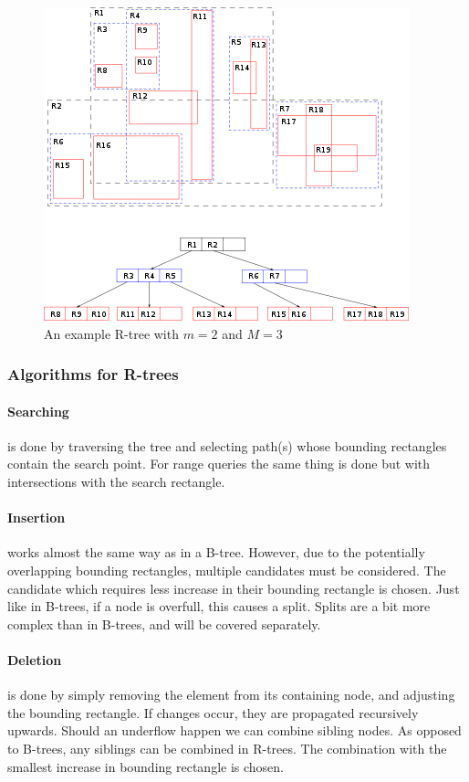 \documentclass{article}
\begin{document}
\begin{figure}[h]
    \centering
    \includegraphics[width=\textwidth]{r-tree.png}
    \caption{An example R-tree with $m=2$ and $M=3$}
    \label{fig:r-tree}
\end{figure}

\subsubsection{Algorithms for R-trees}
\paragraph{Searching} is done by traversing the tree and selecting path(s) whose bounding rectangles contain the search point.
For range queries the same thing is done but with intersections with the search rectangle.

\paragraph{Insertion} works almost the same way as in a B-tree.
However, due to the potentially overlapping bounding rectangles, multiple candidates must be considered.
The candidate which requires less increase in their bounding rectangle is chosen.
Just like in B-trees, if a node is overfull, this causes a split.
Splits are a bit more complex than in B-trees, and will be covered separately.

\paragraph{Deletion} is done by simply removing the element from its containing node, and adjusting the bounding rectangle.
If changes occur, they are propagated recursively upwards.
Should an underflow happen we can combine sibling nodes.
As opposed to B-trees, any siblings can be combined in R-trees.
The combination with the smallest increase in bounding rectangle is chosen.
\end{document}

